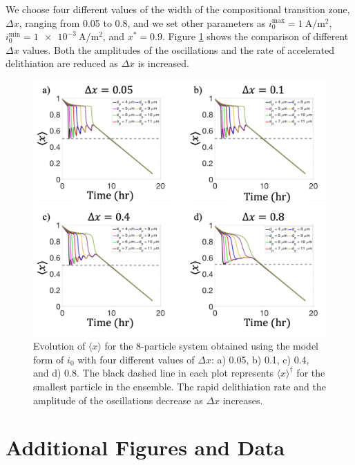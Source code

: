 \documentclass{article}
\begin{document}
We choose four different values of the width of the compositional transition zone, $\Delta x$, ranging from 0.05 to
0.8, and we set other parameters as
$i_0^{\mathrm{max}}=\SI{1}{\ampere\per\meter\squared}$,
$i_0^{\mathrm{min}}=\SI{1e-3}{\ampere\per\meter\squared}$, and
$x^\ast=0.9$. Figure \ref{fig:delta-x-sensitivity} shows the comparison of different
$\Delta x$ values. Both the amplitudes of the oscillations and the
rate of accelerated delithiation are reduced as $\Delta x$ is
increased.

\begin{figure}[hb]
  \includegraphics[width=6.5in]{8-particle-evolution-deltax.png}
  \caption{Evolution of $\langle x\rangle$ for the
    8-particle system obtained using the model form of $i_0$ with
    four different values of $\Delta x$: a) 0.05, b) 0.1, c) 0.4, and d)
    0.8. The black dashed line in each plot represents
    $\langle x \rangle^\dag$ for the smallest particle in
    the ensemble. The rapid delithiation rate and the amplitude of
    the oscillations decrease as $\Delta x$ increases.}
  \label{fig:delta-x-sensitivity}
\end{figure}

\pagebreak
\section{Additional Figures and Data}
\end{document}
